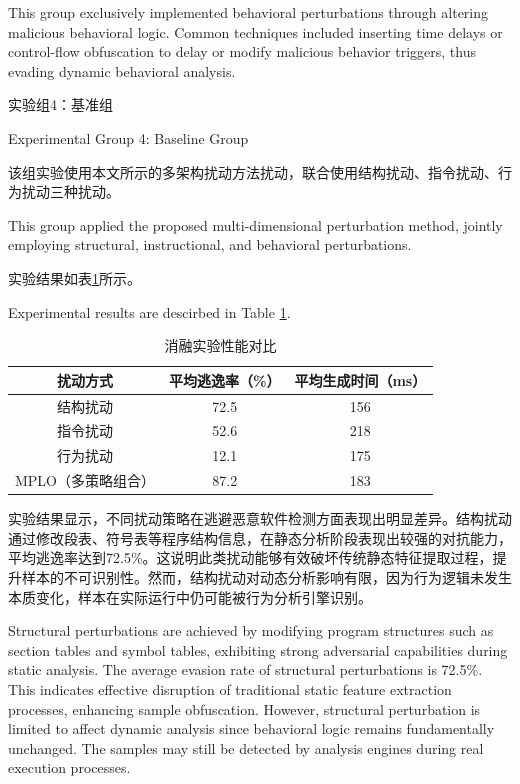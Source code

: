 This group exclusively implemented behavioral perturbations through altering malicious behavioral logic. Common techniques included inserting time delays or control-flow obfuscation to delay or modify malicious behavior triggers, thus evading dynamic behavioral analysis.

实验组4：基准组

Experimental Group 4: Baseline Group

该组实验使用本文所示的多架构扰动方法扰动，联合使用结构扰动、指令扰动、行为扰动三种扰动。

This group applied the proposed multi-dimensional perturbation method, jointly employing structural, instructional, and behavioral perturbations.

实验结果如表\ref{tab:5.11}所示。

Experimental results are descirbed in Table \ref{tab:5.11}.

\begin{table}[htbp]
	\centering
	\caption{消融实验性能对比}
	\label{tab:5.11}
	\begin{tabular*}{0.9\textwidth}{@{\extracolsep{\fill}}ccc}
		\toprule
		扰动方式 & 平均逃逸率（\%） & 平均生成时间（ms） \\
		\midrule
		结构扰动 & 72.5 & 156 \\
		指令扰动 & 52.6 & 218 \\
		行为扰动 & 12.1 & 175 \\
		MPLO（多策略组合） & 87.2 & 183 \\
		\bottomrule
	\end{tabular*}
\end{table}

实验结果显示，不同扰动策略在逃避恶意软件检测方面表现出明显差异。结构扰动通过修改段表、符号表等程序结构信息，在静态分析阶段表现出较强的对抗能力，平均逃逸率达到72.5\%。这说明此类扰动能够有效破坏传统静态特征提取过程，提升样本的不可识别性。然而，结构扰动对动态分析影响有限，因为行为逻辑未发生本质变化，样本在实际运行中仍可能被行为分析引擎识别。

Structural perturbations are achieved by modifying program structures such as section tables and symbol tables, exhibiting strong adversarial capabilities during static analysis. The average evasion rate of structural perturbations is 72.5\%. This indicates effective disruption of traditional static feature extraction processes, enhancing sample obfuscation. However, structural perturbation is limited to affect dynamic analysis since behavioral logic remains fundamentally unchanged. The samples may still be detected by analysis engines during real execution processes.

